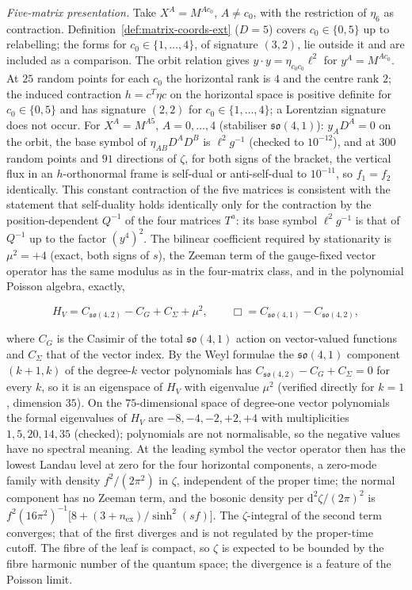 \emph{Five-matrix presentation.} Take \(X^A=M^{Ac_0}\), \(A\ne c_0\), with the restriction of \(\eta_6\) as contraction. Definition~\ref{def:matrix-coords-ext} (\(D=5\)) covers \(c_0\in\{0,5\}\) up to relabelling; the forms for \(c_0\in\{1,\dots,4\}\), of signature \((3,2)\), lie outside it and are included as a comparison. The orbit relation gives \(y\cdot y=\eta_{c_0c_0}\ell^2\) for \(y^A=M^{Ac_0}\). At \(25\) random points for each \(c_0\) the horizontal rank is \(4\) and the centre rank \(2\); the induced contraction \(h=c^{T}\eta c\) on the horizontal space is positive definite for \(c_0\in\{0,5\}\) and has signature \((2,2)\) for \(c_0\in\{1,\dots,4\}\); a Lorentzian signature does not occur. For \(X^A=M^{A5}\), \(A=0,\dots,4\) (stabiliser \(\mathfrak{so}(4,1)\)): \(y_AD^A=0\) on the orbit, the base symbol of \(\eta_{AB}D^AD^B\) is \(\ell^2g^{-1}\) (checked to \(10^{-12}\)), and at \(300\) random points and \(91\) directions of \(\zeta\), for both signs of the bracket, the vertical flux in an \(h\)-orthonormal frame is self-dual or anti-self-dual to \(10^{-11}\), so \(f_1=f_2\) identically. This constant contraction of the five matrices is consistent with the statement that self-duality holds identically only for the contraction by the position-dependent \(Q^{-1}\) of the four matrices \(T^a\): its base symbol \(\ell^2g^{-1}\) is that of \(Q^{-1}\) up to the factor \((y^4)^2\). The bilinear coefficient required by stationarity is \(\mu^2=+4\) (exact, both signs of \(s\)), the Zeeman term of the gauge-fixed vector operator has the same modulus as in the four-matrix class, and in the polynomial Poisson algebra, exactly,

\[

H_V=C_{\mathfrak{so}(4,2)}-C_{G}+C_{\Sigma}+\mu^2,\qquad \Box=C_{\mathfrak{so}(4,1)}-C_{\mathfrak{so}(4,2)},

\]

where \(C_G\) is the Casimir of the total \(\mathfrak{so}(4,1)\) action on vector-valued functions and \(C_\Sigma\) that of the vector index. By the Weyl formulae the \(\mathfrak{so}(4,1)\) component \((k+1,k)\) of the degree-\(k\) vector polynomials has \(C_{\mathfrak{so}(4,2)}-C_G+C_\Sigma=0\) for every \(k\), so it is an eigenspace of \(H_V\) with eigenvalue \(\mu^2\) (verified directly for \(k=1\), dimension \(35\)). On the \(75\)-dimensional space of degree-one vector polynomials the formal eigenvalues of \(H_V\) are \(-8,-4,-2,+2,+4\) with multiplicities \(1,5,20,14,35\) (checked); polynomials are not normalisable, so the negative values have no spectral meaning. At the leading symbol the vector operator then has the lowest Landau level at zero for the four horizontal components, a zero-mode family with density \(f^2/(2\pi^2)\) in \(\zeta\), independent of the proper time; the normal component has no Zeeman term, and the bosonic density per \(\mathrm d^2\zeta/(2\pi)^2\) is \(f^2(16\pi^2)^{-1}\bigl[8+(3+n_{\mathrm{ex}})/\sinh^2(sf)\bigr]\). The \(\zeta\)-integral of the second term converges; that of the first diverges and is not regulated by the proper-time cutoff. The fibre of the leaf is compact, so \(\zeta\) is expected to be bounded by the fibre harmonic number of the quantum space; the divergence is a feature of the Poisson limit.



